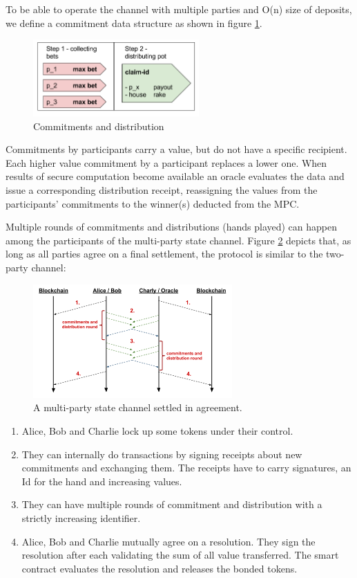 To be able to operate the channel with multiple parties and O(n) size of deposits, we define a commitment data structure as shown in figure \ref{mpc_round}. 

\begin{figure}[!ht]
\centering
\includegraphics[width=2.5in]{images/bet.png}
\caption{Commitments and distribution}
\label{mpc_round}
\end{figure}

Commitments by participants carry a value, but do not have a specific recipient. Each higher value commitment by a participant replaces a lower one. When results of secure computation become available an oracle evaluates the data and issue a corresponding distribution receipt, reassigning the values from the participants' commitments to the winner(s) deducted from the MPC.

Multiple rounds of commitments and distributions (hands played) can happen among the participants of the multi-party state channel. Figure \ref{mpc_settle} depicts that, as long as all parties agree on a final settlement, the protocol is similar to the two-party channel:

\begin{figure}[!ht]
\centering
\includegraphics[width=3.0in]{images/multiSettle.png}
\caption{A multi-party state channel settled in agreement.}
\label{mpc_settle}
\end{figure}

\begin{enumerate}
\item Alice, Bob and Charlie lock up some tokens under their control.
\item They can internally do transactions by signing receipts about new commitments and exchanging them. The receipts have to carry signatures, an Id for the hand and increasing values.
\item They can have multiple rounds of commitment and distribution with a strictly increasing identifier.
\item Alice, Bob and Charlie mutually agree on a resolution. They sign the resolution after each validating the sum of all value transferred. The smart contract evaluates the resolution and releases the bonded tokens.
\end{enumerate}


